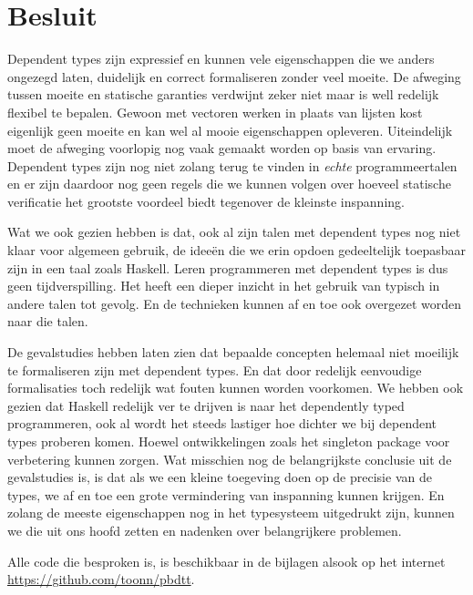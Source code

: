 \chapter{Besluit}
\label{besluit}

Dependent types zijn expressief en kunnen vele eigenschappen die we anders
ongezegd laten, duidelijk en correct formaliseren zonder veel moeite. De
afweging tussen moeite en statische garanties verdwijnt zeker niet maar is well
redelijk flexibel te bepalen. Gewoon met vectoren werken in plaats van lijsten
kost eigenlijk geen moeite en kan wel al mooie eigenschappen opleveren.
Uiteindelijk moet de afweging voorlopig nog vaak gemaakt worden op basis van
ervaring. Dependent types zijn nog niet zolang terug te vinden in \emph{echte}
programmeertalen en er zijn daardoor nog geen regels die we kunnen volgen over
hoeveel statische verificatie het grootste voordeel biedt tegenover de kleinste
inspanning. 

Wat we ook gezien hebben is dat, ook al zijn talen met dependent types nog niet
klaar voor algemeen gebruik, de ideeën die we erin opdoen gedeeltelijk
toepasbaar zijn in een taal zoals Haskell. Leren programmeren met dependent
types is dus geen tijdverspilling. Het heeft een dieper inzicht in het gebruik
van typisch in andere talen tot gevolg. En de technieken kunnen af en toe ook
overgezet worden naar die talen. 

De gevalstudies hebben laten zien dat bepaalde concepten helemaal niet moeilijk
te formaliseren zijn met dependent types. En dat door redelijk eenvoudige
formalisaties toch redelijk wat fouten kunnen worden voorkomen. We hebben ook
gezien dat Haskell redelijk ver te drijven is naar het dependently typed
programmeren, ook al wordt het steeds lastiger hoe dichter we bij dependent
types proberen komen. Hoewel ontwikkelingen zoals het singleton package voor
verbetering kunnen zorgen. Wat misschien nog de belangrijkste conclusie uit de
gevalstudies is, is dat als we een kleine toegeving doen op de precisie van de
types, we af en toe een grote vermindering van inspanning kunnen krijgen. En
zolang de meeste eigenschappen nog in het typesysteem uitgedrukt zijn, kunnen
we die uit ons hoofd zetten en nadenken over belangrijkere problemen.

Alle code die besproken is, is beschikbaar in de bijlagen alsook op het
internet \url{https://github.com/toonn/pbdtt}.
